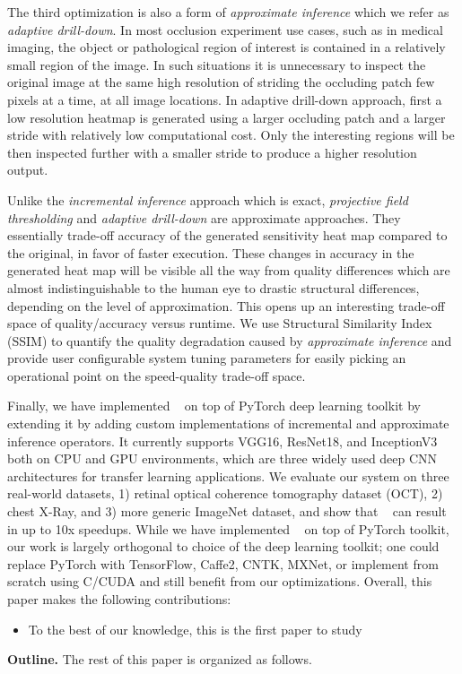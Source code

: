 The third optimization is also a form of \textit{approximate inference} which we refer as \textit{adaptive drill-down}.
In most occlusion experiment use cases, such as in medical imaging, the object or pathological region of interest is contained in a relatively small region of the image.
In such situations it is unnecessary to inspect the original image at the same high resolution of striding the occluding patch few pixels at a time, at all image locations.
In adaptive drill-down approach, first a low resolution heatmap is generated using a larger occluding patch and a larger stride with relatively low computational cost.
Only the interesting regions will be then inspected further with a smaller stride to produce a higher resolution output.

Unlike the \textit{incremental inference} approach which is exact, \textit{projective field thresholding} and \textit{adaptive drill-down} are approximate approaches. They essentially trade-off accuracy of the generated sensitivity heat map compared to the original, in favor of faster execution.
These changes in accuracy in the generated heat map will be visible all the way from quality differences which are almost indistinguishable to the human eye to drastic structural differences, depending on the level of approximation.
This opens up an interesting trade-off space of quality/accuracy versus runtime. We use Structural Similarity Index (SSIM) to quantify the quality degradation caused by \textit{approximate inference} and provide user configurable system tuning parameters for easily picking an operational point on the speed-quality trade-off space.

Finally, we have implemented \system~ on top of PyTorch deep learning toolkit by extending it by adding custom implementations of incremental and approximate inference operators.
It currently supports VGG16, ResNet18, and InceptionV3 both on CPU and GPU environments, which are three widely used deep CNN architectures for transfer learning applications.
We evaluate our system on three real-world datasets, 1) retinal optical coherence tomography dataset (OCT), 2) chest X-Ray, and 3) more generic ImageNet dataset, and show that \system~ can result in up to 10x speedups. While we have implemented \system~ on top of PyTorch toolkit, our work is largely orthogonal to choice of the deep learning toolkit; one could replace PyTorch with TensorFlow, Caffe2, CNTK, MXNet, or implement from scratch using C/CUDA and still benefit from our optimizations.
Overall, this paper makes the following contributions:

\begin{itemize}
	\item To the best of our knowledge, this is the first paper to study
\end{itemize}

\vspace{2mm}
\noindent \textbf{Outline.} The rest of this paper is organized as follows.
